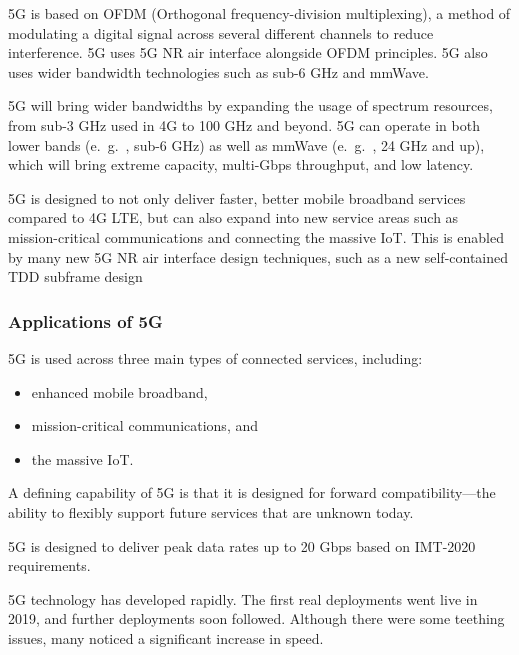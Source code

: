 5G is based on OFDM (Orthogonal frequency-division multiplexing), a method of modulating a digital signal across several different channels to reduce interference. 5G uses 5G NR air interface alongside OFDM principles. 5G also uses wider bandwidth technologies such as sub-6 GHz and mmWave.

5G will bring wider bandwidths by expanding the usage of spectrum resources, from sub-3 GHz used in 4G to 100 GHz and beyond. 5G can operate in both lower bands (e.\ g.\ , sub-6 GHz) as well as mmWave (e.\ g.\ , 24 GHz and up), which will bring extreme capacity, multi-Gbps throughput, and low latency.

5G is designed to not only deliver faster, better mobile broadband services compared to 4G LTE, but can also expand into new service areas such as mission-critical communications and connecting the massive IoT. This is enabled by many new 5G NR air interface design techniques, such as a new self-contained TDD subframe design


\subsubsection*{Applications of 5G}
5G is used across three main types of connected services, including:
\begin{itemize}
	 \item enhanced mobile broadband, 
	 \item mission-critical communications, and 
	 \item the massive IoT. 
\end{itemize}
A defining capability of 5G is that it is designed for forward compatibility—the ability to flexibly support future services that are unknown today.

5G is designed to deliver peak data rates up to 20 Gbps based on IMT-2020 requirements.


5G technology has developed rapidly. The first real deployments went live in 2019, and further deployments soon followed. Although there were some teething issues, many noticed a significant increase in speed.





